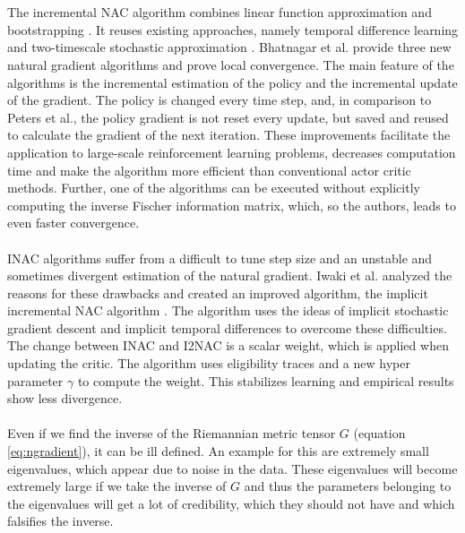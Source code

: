 \\\\
 The incremental NAC algorithm combines linear function approximation and bootstrapping \citep{bhatnagar2008incremental}. It reuses existing approaches, namely temporal difference learning \citep{sutton2018reinforcement} and two-timescale stochastic approximation \citep{bhatnagar1998two}. Bhatnagar et al. provide three new natural gradient algorithms and prove local convergence. The main feature of the algorithms is the incremental estimation of the policy and the incremental update of the gradient. The policy is changed every time step, and, in comparison to Peters et al., the policy gradient is not reset every update, but saved and reused to calculate the gradient of the next iteration. These improvements facilitate the application to large-scale reinforcement learning problems, decreases computation time and make the algorithm more efficient than conventional actor critic methods. Further, one of the algorithms can be executed without explicitly computing the inverse Fischer information matrix, which, so the authors, leads to even faster convergence.
\\\\
 INAC algorithms suffer from a difficult to tune step size and an unstable and sometimes divergent estimation of the natural gradient. Iwaki et al. analyzed the reasons for these drawbacks and created an improved algorithm, the implicit incremental NAC algorithm \citep{iwaki2019implicit}. The algorithm uses the ideas of implicit stochastic gradient descent \citep{toulis2014statistical} and implicit temporal diﬀerences \citep{tamar2014implicit} to overcome these difficulties. The change between INAC and I2NAC is a scalar weight, which is applied when updating the critic. The algorithm uses eligibility traces and a new hyper parameter $\gamma$ to compute the weight. This stabilizes learning and empirical results show less divergence.
\\\\
 Even if we find the inverse of the Riemannian metric tensor $G$ (equation \ref{eq:ngradient}), it can be ill defined. An example for this are extremely small eigenvalues, which appear due to noise in the data. These eigenvalues will become extremely large if we take the inverse of $G$ and thus the parameters belonging to the eigenvalues will get a lot of credibility, which they should not have and which falsifies the inverse.

